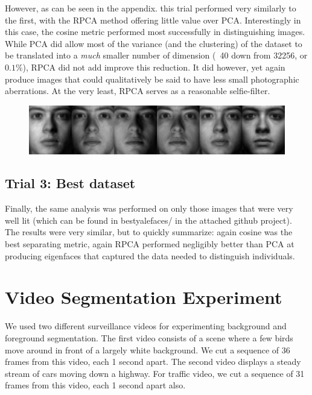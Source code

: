 \documentclass[11pt]{scrartcl} %
\theoremstyle{plain}
\begin{document}
However, as can be seen in the appendix. this trial performed very similarly to the first, with the RPCA method offering little value over PCA. Interestingly in this case, the cosine metric performed most successfully in distinguishing images. While PCA did allow most of the variance (and the clustering) of the dataset to be translated into a \emph{much} smaller  number of dimension (~40 down from 32256, or $0.1\%$), RPCA did not add improve this reduction. It did however, yet again produce images that could qualitatively be said to have less small photographic aberrations. At the very least, RPCA serves as a reasonable selfie-filter.

\begin{figure}[H]
\includegraphics[width=\textwidth]{figures/person24Afterl=0dot005RPCAtrial2.jpg} 
\centering
\end{figure}

\subsection{Trial 3: Best dataset}

Finally, the same analysis was performed on only those images that were very well lit (which can be found in bestyalefaces/ in the attached github project). The results were very similar, but to quickly summarize: again cosine was the best separating metric, again RPCA performed negligibly better than PCA at producing eigenfaces that captured the data needed to distinguish individuals. 

\section{Video Segmentation Experiment}

We used two different surveillance videos for experimenting background and foreground segmentation. The first video consists of a scene where a few birds move around in front of a largely white background. We cut a sequence of 36 frames from this video, each 1 second apart. The second video  displays a steady stream of cars moving down a highway. For traffic video, we cut a sequence of 31 frames from this video, each 1 second apart also. 
\end{document}
